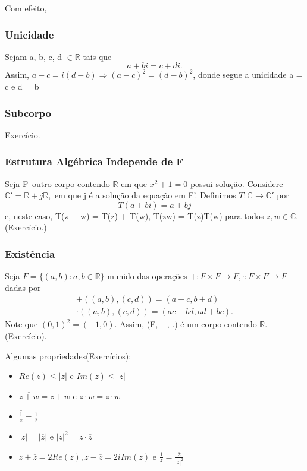 \documentclass{article}
\begin{document}
  Com efeito, 
  \subsubsection{Unicidade}
  Sejam a, b, c, d $\in \mathbb{R}$ tais que 
  $$
  a + bi = c + di.
  $$
  Assim, $a-c = i(d-b)\Rightarrow (a-c)^{2} = (d-b)^{2}$, donde segue a unicidade a = c e d = b
  \subsubsection{Subcorpo}
  Exerc\'icio.
  \subsubsection{Estrutura Alg\'ebrica Independe de F}
  Seja F\ outro corpo contendo $\mathbb{R}$ em que $x ^{2} + 1 = 0$ possui solu\c c\~ao. Considere $\mathbb{C}' = \mathbb{R} + j \mathbb{R},$
  em que j \'e a solu\c c\~ao da equa\c c\~ao em F'. Definimos $T:\mathbb{C}\rightarrow \mathbb{C}'$ por 
  $$
  T(a + bi) = a + bj
  $$
e, neste caso, T(z + w) = T(z) + T(w), T(zw) = T(z)T(w) para todos $z, w\in \mathbb{C}.$ (Exerc\'icio.)
  \subsubsection{Exist\^encia}
  Seja $F = \{(a, b):a, b\in \mathbb{R}\}$ munido das opera\c c\~oes $+:F\times{F}\rightarrow F, \cdot:F\times{F}\rightarrow F$ dadas por
 \begin{align*}
  +((a, b), (c,d)) = (a + c, b + d) \\
  \cdot((a, b), (c, d)) = (ac - bd, ad + bc).
 \end{align*}
  Note que $(0, 1)^{2} = (-1, 0)$. Assim, (F, +, .) \'e um corpo contendo $\mathbb{R}.$ (Exerc\'icio).

  Algumas propriedades(Exerc\'icios):
 \begin{itemize}
   \item[a)] $Re(z)\leq{|z|}$ e $Im(z)\leq{|z|}$
   \item[b)] $\overline{z+w} = \overline{z}+\overline{w}$ e $\overline{z\cdot w} = \overline{z}\cdot\overline{w}$
   \item[c)] $\overline{\frac{1}{z}} = \frac{1}{\overline{z}}$
   \item[d)] $|z| = |\overline{z}|$ e $|z|^{2} = z\cdot\overline{z}$
   \item[e)] $z + \overline{z} = 2Re(z), z - \overline{z} = 2iIm(z)$ e $\frac{1}{z} = \frac{\overline{z}}{|z|^{2}}$
 \end{itemize}
\end{document}
